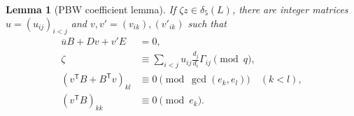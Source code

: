 \documentclass[11pt]{amsart}
\newtheorem{lemma}[theorem]{Lemma}
\theoremstyle{remark}
\newcommand{\dlt}{\delta}
\begin{document}
\begin{lemma}[PBW coefficient lemma]\label{lem:PBW}
If $\zeta z\in\dlt_5(L)$, there are integer matrices
$u=(u_{ij})_{i<j}$ and $v,v'=(v_{ik}),(v'_{ik})$ such that
\begin{align}
 \overline uB+Dv+v'E&=0,                                 \label{eq:PBW-B}\\
 \zeta&\equiv
  \sum_{i<j}u_{ij}\frac{d_j}{d_i}\Gamma_{ij}\pmod q,    \label{eq:PBW-Z}\\
 (v^{\mathsf T}B+B^{\mathsf T}v)_{kl}
  &\equiv0\pmod{\gcd(e_k,e_l)}\quad(k<l),               \label{eq:PBW-C1}\\
 (v^{\mathsf T}B)_{kk}&\equiv0\pmod{e_k}.               \label{eq:PBW-C2}
\end{align}
\end{lemma}
\end{document}

